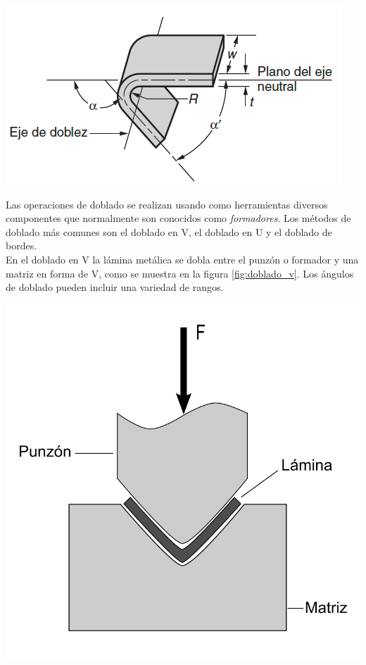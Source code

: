 \begin{center}
\includegraphics[scale=0.9]{src/ch2/doblado_lamina.png}
\label{fig:doblado_lamina}
\end{center}

Las operaciones de doblado se realizan usando como herramientas diversos componentes 
que normalmente son conocidos como \textit{formadores}. Los métodos de doblado más 
comunes son el doblado en V, el doblado en U y el doblado de bordes.\\

En el doblado en V la lámina metálica se dobla entre el punzón o formador y una matriz 
en forma de V, como se muestra en la figura \ref{fig:doblado_v}. Los ángulos de doblado 
pueden incluir una variedad de rangos.

\begin{center}
\includegraphics[scale=0.4]{src/ch2/doblado_v}
\label{fig:doblado_v}
\end{center}

